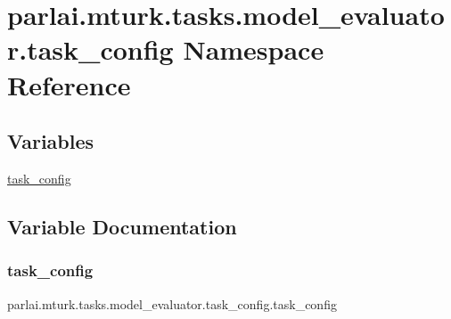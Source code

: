 \hypertarget{namespaceparlai_1_1mturk_1_1tasks_1_1model__evaluator_1_1task__config}{}\section{parlai.\+mturk.\+tasks.\+model\+\_\+evaluator.\+task\+\_\+config Namespace Reference}
\label{namespaceparlai_1_1mturk_1_1tasks_1_1model__evaluator_1_1task__config}
\subsection*{Variables}
\begin{DoxyCompactItemize}
\item 
\hyperlink{namespaceparlai_1_1mturk_1_1tasks_1_1model__evaluator_1_1task__config_a7c716835083f73ead91fee6f4166038c}{task\+\_\+config}
\end{DoxyCompactItemize}


\subsection{Variable Documentation}
\mbox{\label{namespaceparlai_1_1mturk_1_1tasks_1_1model__evaluator_1_1task__config_a7c716835083f73ead91fee6f4166038c}} 
\subsubsection{\texorpdfstring{task\+\_\+config}{task\_config}}
{\footnotesize\ttfamily parlai.\+mturk.\+tasks.\+model\+\_\+evaluator.\+task\+\_\+config.\+task\+\_\+config}

